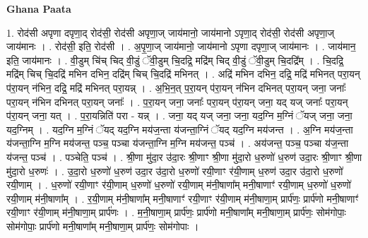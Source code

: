 \documentclass[17pt]{extarticle}
\begin{document}
\textbf{Ghana Paata } \newline

1. रोद॑सी अपृणा दपृणा॒द् रोद॑सी॒ रोद॑सी अपृणा॒ज् जाय॑मानो॒ जाय॑मानो ऽपृणा॒द् रोद॑सी॒ रोद॑सी अपृणा॒ज् जाय॑मानः । . रोद॑सी॒ इति॒ रोद॑सी । . अ॒पृ॒णा॒ज् जाय॑मानो॒ जाय॑मानो ऽपृणा दपृणा॒ज् जाय॑मानः । . जाय॑मान॒ इति॒ जाय॑मानः । . वी॒डुम् चि॑च् चिद् वी॒डुं ॅवी॒डुम् चि॒दद्रि॒ मद्रि॑म् चिद् वी॒डुं ॅवी॒डुम् चि॒दद्रि᳚म् । . चि॒दद्रि॒ मद्रि॑म् चिच् चि॒दद्रि॑ मभिन दभिन॒ दद्रि॑म् चिच् चि॒दद्रि॑ मभिनत् । . अद्रि॑ मभिन दभिन॒ दद्रि॒ मद्रि॑ मभिनत् परा॒यन् प॑रा॒यन् न॑भिन॒ दद्रि॒ मद्रि॑ मभिनत् परा॒यन्न् । . अ॒भि॒न॒त् प॒रा॒यन् प॑रा॒यन् न॑भिन दभिनत् परा॒यन् जना॒ जनाः᳚ परा॒यन् न॑भिन दभिनत् परा॒यन् जनाः᳚ । . प॒रा॒यन् जना॒ जनाः᳚ परा॒यन् प॑रा॒यन् जना॒ यद् यज् जनाः᳚ परा॒यन् प॑रा॒यन् जना॒ यत् । . प॒रा॒यन्निति॑ परा - यन्न् । . जना॒ यद् यज् जना॒ जना॒ यद॒ग्नि म॒ग्निं ॅयज् जना॒ जना॒ यद॒ग्निम् । . यद॒ग्नि म॒ग्निं ॅयद् यद॒ग्नि मय॑ज॒न्ता य॑जन्ता॒ग्निं ॅयद् यद॒ग्नि मय॑जन्त । . अ॒ग्नि मय॑ज॒न्ता य॑जन्ता॒ग्नि म॒ग्नि मय॑जन्त॒ पञ्च॒ पञ्चा य॑जन्ता॒ग्नि म॒ग्नि मय॑जन्त॒ पञ्च॑ । . अय॑जन्त॒ पञ्च॒ पञ्चा य॑ज॒न्ता य॑जन्त॒ पञ्च॑ । . पञ्चेति॒ पञ्च॑ । . श्री॒णा मु॑दा॒र उ॑दा॒रः श्री॒णाꣳ श्री॒णा मु॑दा॒रो ध॒रुणो॑ ध॒रुण॑ उदा॒रः श्री॒णाꣳ श्री॒णा मु॑दा॒रो ध॒रुणः॑ । . उ॒दा॒रो ध॒रुणो॑ ध॒रुण॑ उदा॒र उ॑दा॒रो ध॒रुणो॑ रयी॒णाꣳ र॑यी॒णाम् ध॒रुण॑ उदा॒र उ॑दा॒रो ध॒रुणो॑ रयी॒णाम् । . ध॒रुणो॑ रयी॒णाꣳ र॑यी॒णाम् ध॒रुणो॑ ध॒रुणो॑ रयी॒णाम् म॑नी॒षाणा᳚म् मनी॒षाणाꣳ॑ रयी॒णाम् ध॒रुणो॑ ध॒रुणो॑ रयी॒णाम् म॑नी॒षाणा᳚म् । . र॒यी॒णाम् म॑नी॒षाणा᳚म् मनी॒षाणाꣳ॑ रयी॒णाꣳ र॑यी॒णाम् म॑नी॒षाणा॒म् प्रार्प॑णः॒ प्रार्प॑णो मनी॒षाणाꣳ॑ रयी॒णाꣳ र॑यी॒णाम् म॑नी॒षाणा॒म् प्रार्प॑णः । . म॒नी॒षाणा॒म् प्रार्प॑णः॒ प्रार्प॑णो मनी॒षाणा᳚म् मनी॒षाणा॒म् प्रार्प॑णः॒ सोम॑गोपाः॒ सोम॑गोपाः॒ प्रार्प॑णो मनी॒षाणा᳚म् मनी॒षाणा॒म् प्रार्प॑णः॒ सोम॑गोपाः । \newline
\end{document}
